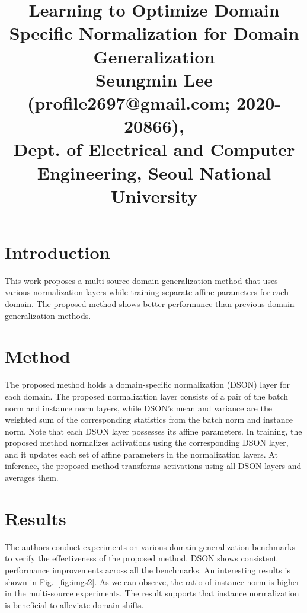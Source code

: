 \documentclass[10pt,twocolumn,letterpaper]{article}
\begin{document}
\title{Learning to Optimize Domain Specific Normalization for Domain Generalization\\ {\rm {\normalsize Seungmin Lee (profile2697@gmail.com; 2020-20866), \\Dept. of Electrical and Computer Engineering, Seoul National University}}}   %

\maketitle
\thispagestyle{empty}

\section{Introduction}
This work proposes a multi-source domain generalization method that uses various normalization layers while training separate affine parameters for each domain. The proposed method shows better performance than previous domain generalization methods.


\section{Method}
The proposed method holds a domain-specific normalization (DSON) layer for each domain. The proposed normalization layer consists of a pair of the batch norm and instance norm layers, while DSON's mean and variance are the weighted sum of the corresponding statistics from the batch norm and instance norm. Note that each DSON layer possesses its affine parameters. 
In training, the proposed method normalizes activations using the corresponding DSON layer, and it updates each set of affine parameters in the normalization layers. At inference, the proposed method transforms activations using all DSON layers and averages them. 

\section{Results}
The authors conduct experiments on various domain generalization benchmarks to verify the effectiveness of the proposed method. DSON shows consistent performance improvements across all the benchmarks.
An interesting results is shown in Fig.~\ref{fig:imgs2}. As we can observe, the ratio of instance norm is higher in the multi-source experiments. The result supports that instance normalization is beneficial to alleviate domain shifts.
\end{document}
